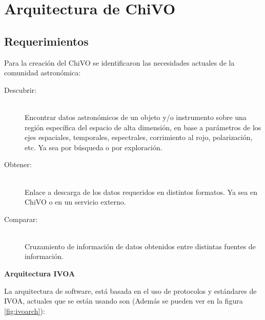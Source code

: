 \section{Arquitectura de ChiVO}

\subsection{Requerimientos}

Para la creación del ChiVO se identificaron las necesidades actuales de la comunidad
astronómica:

\begin{description}
    \item[Descubrir:] \hfill \\
        Encontrar datos astronómicos de un objeto y/o instrumento sobre una región
        específica del espacio de alta dimensión, en base a parámetros de los ejes
        espaciales, temporales, espectrales, corrimiento al rojo, polarización, etc.
        Ya sea por búsqueda o por exploración.
    \item[Obtener:] \hfill \\
        Enlace a descarga de los datos requeridos en distintos formatos.
        Ya sea en ChiVO o en un servicio externo.
    \item[Comparar:] \hfill \\
        Cruzamiento de información de datos obtenidos entre distintas fuentes de
        información.
\end{description}


\textbf{Arquitectura IVOA}

La arquitectura de software, está basada en el uso de protocolos y estándares de
IVOA, actuales que se están usando son (Además se pueden ver en la figura \ref{fig:ivoarch}):

